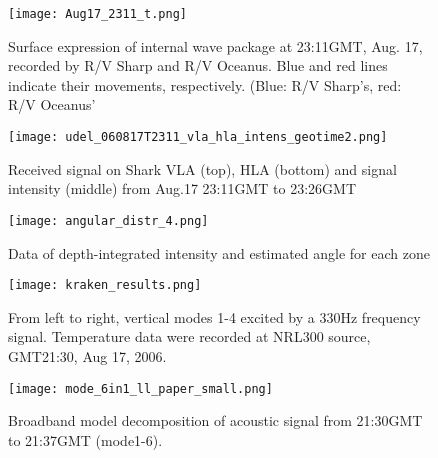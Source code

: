 

\begin{figure}[H]
  \centering
  \texttt{[image: Aug17\_2311\_t.png]}
  \caption{Surface expression of internal wave package at 23:11GMT, Aug. 17, recorded by R/V Sharp and R/V Oceanus. Blue and red lines indicate their movements, respectively. (Blue: R/V Sharp's, red: R/V Oceanus'}\label{fig:r2130_r}
\end{figure}


\begin{figure}[H]
  \centering
  \texttt{[image: udel\_060817T2311\_vla\_hla\_intens\_geotime2.png]}
  \caption{Received signal on Shark VLA (top), HLA (bottom) and signal intensity (middle) from Aug.17 23:11GMT to 23:26GMT }\label{fig:a2130}
\end{figure}



\clearpage


\begin{figure}[H]
  \centering
  \texttt{[image: angular\_distr\_4.png]}
  \caption{Data of depth-integrated intensity and estimated angle for each zone }\label{fig:a2130}
\end{figure}



\begin{figure}[H]
  \centering
  \texttt{[image: kraken\_results.png]}
  \caption{From left to right, vertical modes 1-4 excited by a 330Hz frequency signal. Temperature data were recorded at NRL300 source, GMT21:30, Aug 17, 2006.}\label{fig:a2130}
\end{figure}


\begin{figure}[H]
  \centering
  \texttt{[image: mode\_6in1\_ll\_paper\_small.png]}
  \caption{Broadband model decomposition of acoustic signal from 21:30GMT to 21:37GMT (mode1-6).}\label{fig:a2130}
\end{figure}


